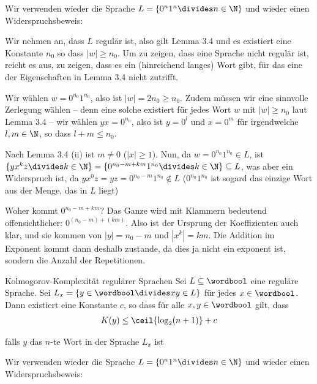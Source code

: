 \newpage
\numberingOff
\inlineex Wir verwenden wieder die Sprache $L = \{ 0^n 1^n \divides n \in \N \}$ und wieder einen Widerspruchsbeweis:

Wir nehmen an, dass $L$ regulär ist, also gilt Lemma 3.4 und es existiert eine Konstante $n_0$ so dass $|w| \geq n_0$.
Um zu zeigen, dass eine Sprache nicht regulär ist, reicht es aus, zu zeigen, dass es ein (hinreichend langes) Wort gibt, für das eine der Eigenschaften in Lemma 3.4 nicht zutrifft.

Wir wählen $w = 0^{n_0} 1^{n_0}$, also ist $|w| = 2n_0 \geq n_0$.
Zudem müssen wir eine sinnvolle Zerlegung wählen -- denn eine solche existiert für jedes Wort $w$ mit $|w| \geq n_0$ laut Lemma 3.4 --
wir wählen $yx = 0^{n_0}$, also ist $y = 0^l$ und $x = 0^m$ für irgendwelche $l, m \in \N$, so dass $l + m \leq n_0$.

Nach Lemma 3.4 (ii) ist $m \neq 0$ ($|x| \geq 1$).
Nun, da $w = 0^{n_0} 1^{n_0} \in L$, ist $\{ yx^kz \divides k \in \N \} = \{ 0^{n_0 - m + km} 1^{n_0} \divides k \in \N \} \subseteq L$, was aber ein Widerspruch ist,
da $yx^0z = yz = 0^{n_0 - m} 1^{n_0} \notin L$ ($0^{n_0}1^{n_0}$ ist sogard das einzige Wort aus der Menge, das in $L$ liegt)

\inlineintuition Woher kommt $0^{n_0 - m + km}$?
Das Ganze wird mit Klammern bedeutend offensichtlicher: $0^{(n_0 - m) + (km)}$.
Also ist der Ursprung der Koeffizienten auch klar, und sie kommen von $|y| = n_0 - m$ und $|x^k| = km$.
Die Addition im Exponent kommt dann deshalb zustande, da dies ja nicht ein exponent ist, sondern die Anzahl der Repetitionen.

\numberingOn


\begin{theorem}[]{Kolmogorov-Komplexität regulärer Sprachen}
    Sei $L \subseteq \wordbool$ eine reguläre Sprache. Sei $L_x = \{ y \in \wordbool \divides xy \in L \}$ für jedes $x \in \wordbool$.
    Dann existiert eine Konstante $c$, so dass für alle $x, y \in \wordbool$ gilt, dass
    \rmvspace
    \begin{align*}
        K(y) \leq \ceil{\log_2(n + 1)} + c
    \end{align*}

    \rmvspace
    falls $y$ das $n$-te Wort in der Sprache $L_x$ ist
\end{theorem}

\numberingOff
\inlineex Wir verwenden wieder die Sprache $L = \{ 0^n 1^n \divides n \in \N \}$ und wieder einen Widerspruchsbeweis:

